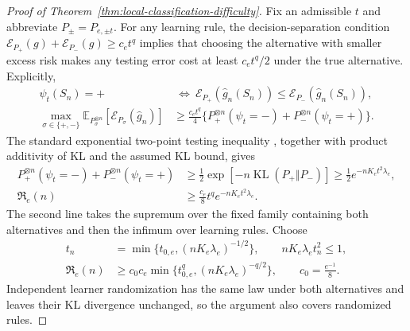 \begin{proof}[Proof of Theorem~\ref{thm:local-classification-difficulty}]
Fix an admissible $t$ and abbreviate $P_\pm=P_{e,\pm t}$. For any learning rule, the decision-separation condition $\mathcal E_{P_+}(g)+\mathcal E_{P_-}(g)\ge c_et^q$ implies that choosing the alternative with smaller excess risk makes any testing error cost at least $c_et^q/2$ under the true alternative. Explicitly,
\begin{equation}
\begin{aligned}
\psi_t(S_n)=+&\ \Longleftrightarrow\ 
\mathcal E_{P_+}(\widehat g_n(S_n))\le\mathcal E_{P_-}(\widehat g_n(S_n)),\\
\max_{\sigma\in\{+,-\}}\mathbb E_{P_\sigma^{\otimes n}}[\mathcal E_{P_\sigma}(\widehat g_n)]
&\ge\frac{c_et^q}{4}\{P_+^{\otimes n}(\psi_t=-)+P_-^{\otimes n}(\psi_t=+)\}.
\end{aligned}
\label{eq:app-risk-to-testing}
\end{equation}
The standard exponential two-point testing inequality \citep[Lemma~2.6]{tsybakov2009introduction}, together with product additivity of KL and the assumed KL bound, gives
\begin{equation}
\begin{aligned}
P_+^{\otimes n}(\psi_t=-)+P_-^{\otimes n}(\psi_t=+)
&\ge\tfrac12\exp[-n\operatorname{KL}(P_+\Vert P_-)]
\ge\tfrac12 e^{-nK_et^2\lambda_e},\\
\mathfrak R_e(n)&\ge\frac{c_e}{8}t^q e^{-nK_et^2\lambda_e}.
\end{aligned}
\label{eq:app-testing-reduction}
\end{equation}
The second line takes the supremum over the fixed family containing both alternatives and then the infimum over learning rules. Choose
\begin{equation}
\begin{aligned}
t_n&=\min\{t_{0,e},(nK_e\lambda_e)^{-1/2}\},\qquad nK_e\lambda_et_n^2\le1,\\
\mathfrak R_e(n)&\ge c_0c_e\min\{t_{0,e}^{q},(nK_e\lambda_e)^{-q/2}\},
\qquad c_0=\frac{e^{-1}}8.
\end{aligned}
\label{eq:app-local-risk-bound}
\end{equation}
Independent learner randomization has the same law under both alternatives and leaves their KL divergence unchanged, so the argument also covers randomized rules.
\end{proof}

